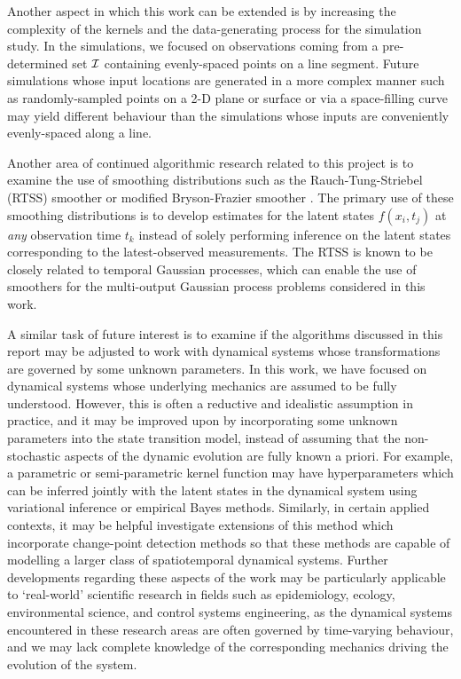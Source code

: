 \documentclass[10pt]{article}
\numberwithin{equation}{section}
\begin{document}
Another aspect in which this work can be extended is by increasing the complexity of the kernels and the data-generating process for the simulation study. In the simulations, we focused on observations coming from a pre-determined set $\mathcal{I}$ containing evenly-spaced points on a line segment. Future simulations whose input locations are generated in a more complex manner such as randomly-sampled points on a 2-D plane or surface or via a space-filling curve may yield different behaviour than the simulations whose inputs are conveniently evenly-spaced along a line.

Another area of continued algorithmic research related to this project is to examine the use of smoothing distributions such as the Rauch-Tung-Striebel (RTSS) smoother \citep{Rauch-RTSS-1965,Bayesian-Filter-Book-2023} or modified Bryson-Frazier smoother \citep{Colemont-MBF-Smoothing-2026}. The primary use of these smoothing distributions is to develop estimates for the latent states $f(x_{i}, t_{j})$ at \emph{any} observation time $t_{k}$ instead of solely performing inference on the latent states corresponding to the latest-observed measurements. The RTSS is known \citet{Hartikainen-Smoothing-GP-2010,Sarkka-Spatial-Kalman-2012} to be closely related to temporal Gaussian processes, which can enable the use of smoothers for the multi-output Gaussian process problems considered in this work.

A similar task of future interest is to examine if the algorithms discussed in this report may be adjusted to work with dynamical systems whose transformations are governed by some unknown parameters. In this work, we have focused on dynamical systems whose underlying mechanics are assumed to be fully understood. However, this is often a reductive and idealistic assumption in practice, and it may be improved upon by incorporating some unknown parameters into the state transition model, instead of assuming that the non-stochastic aspects of the dynamic evolution are fully known a priori. For example, a parametric or semi-parametric kernel function may have hyperparameters which can be inferred jointly with the latent states in the dynamical system using variational inference or empirical Bayes methods. Similarly, in certain applied contexts, it may be helpful investigate extensions of this method which incorporate change-point detection methods so that these methods are capable of modelling a larger class of spatiotemporal dynamical systems. Further developments regarding these aspects of the work may be particularly applicable to `real-world' scientific research in fields such as epidemiology, ecology, environmental science, and control systems engineering, as the dynamical systems encountered in these research areas are often governed by time-varying behaviour, and we may lack complete knowledge of the corresponding mechanics driving the evolution of the system.
\end{document}
